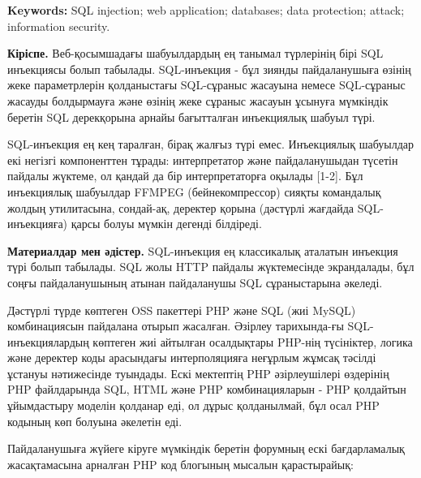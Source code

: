 {\bfseries Keywords:} SQL injection; web application; databases; data
protection; attack; information security.
\begin{multicols}{2}

{\bfseries Кіріспе.} Веб-қосымшадағы шабуылдардың ең танымал түрлерінің
бірі SQL инъекциясы болып табылады. SQL-инъекция - бұл зиянды
пайдаланушыға өзінің жеке параметрлерін қолданыстағы SQL-сұраныс
жасауына немесе SQL-сұраныс жасауды болдырмауға және өзінің жеке сұраныс
жасауын ұсынуға мүмкіндік беретін SQL дерекқорына арнайы бағытталған
инъекциялық шабуыл түрі.

SQL-инъекция ең кең таралған, бірақ жалғыз түрі емес. Инъекциялық
шабуылдар екі негізгі компоненттен тұрады: интерпретатор және
пайдаланушыдан түсетін пайдалы жүктеме, ол қандай да бір интерпретаторға
оқылады {[}1-2{]}. Бұл инъекциялық шабуылдар FFMPEG (бейнекомпрессор)
сияқты командалық жолдың утилитасына, сондай-ақ, деректер қорына
(дәстүрлі жағдайда SQL-инъекцияға) қарсы болуы мүмкін дегенді білдіреді.

{\bfseries Материалдар мен әдістер.} SQL-инъекция ең классикалық аталатын
инъекция түрі болып табылады. SQL жолы HTTP пайдалы жүктемесінде
экрандалады, бұл соңғы пайдаланушының атынан пайдаланушы SQL
сұраныстарына әкеледі.

Дәстүрлі түрде көптеген OSS пакеттері PHP және SQL (жиі MySQL)
комбинациясын пайдалана отырып жасалған. Әзірлеу тарихында-ғы
SQL-инъекциялардың көптеген жиі айтылған осалдықтары PHP-нің түсініктер,
логика және деректер коды арасындағы интерполяцияға неғұрлым жұмсақ
тәсілді ұстануы нәтижесінде туындады. Ескі мектептің PHP әзірлеушілері
өздерінің PHP файлдарында SQL, HTML және PHP комбинацияларын - PHP
қолдайтын ұйымдастыру моделін қолданар еді, ол дұрыс қолданылмай, бұл
осал PHP кодының көп болуына әкелетін еді.

Пайдаланушыға жүйеге кіруге мүмкіндік беретін форумның ескі
бағдарламалық жасақтамасына арналған PHP код блогының мысалын
қарастырайық:
\end{multicols}


